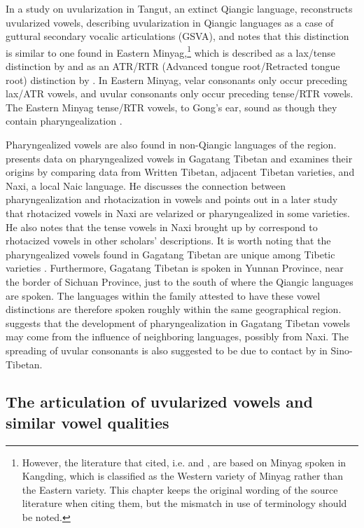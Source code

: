 \documentclass[output=paper]{langscibook}
\begin{document}
In a study on uvularization in Tangut, an extinct Qiangic language, \citet[193--194]{Gong2020} reconstructs uvularized vowels, describing uvularization in Qiangic languages as a case of guttural secondary vocalic articulations (GSVA), and notes that this distinction is similar to one found in Eastern Minyag,\footnote{However, the literature that \citet{Gong2020} cited, i.e. \cite{Huang1985} and \citet{Gao2015}, are based on Minyag spoken in Kangding, which is classified as the Western variety of Minyag rather than  the Eastern variety. This chapter keeps the original wording of the source literature when citing them, but the mismatch in use of terminology should be noted.} which is described as a lax/tense distinction by \citet{Huang1985} and as an ATR/RTR (Advanced tongue root/Retracted tongue root) distinction by \citet{Gao2015}. In Eastern Minyag, velar consonants only occur preceding lax/ATR vowels, and uvular consonants only occur preceding tense/RTR vowels. The Eastern Minyag tense/RTR vowels, to Gong’s ear, sound as though they contain pharyngealization \citep[194]{Gong2020}.

Pharyngealized vowels are also found in non-Qiangic languages of the region. \citet{Suzuki2011} presents data on pharyngealized vowels in Gagatang Tibetan and examines their origins by comparing data from Written Tibetan, adjacent Tibetan varieties, and Naxi, a local Naic language. He discusses the connection between pharyngealization and rhotacization in vowels and points out in a later study \citep[29--31]{Suzuki2013} that rhotacized vowels in Naxi are velarized or pharyngealized in some varieties. He also notes that the tense vowels in Naxi brought up by \citet{Yang1984,Yang1991} correspond to rhotacized vowels in other scholars’ descriptions. It is worth noting that the pharyngealized vowels found in Gagatang Tibetan are unique among Tibetic varieties \citep[489]{Suzuki2011}. Furthermore, Gaga\-tang Tibetan is spoken in Yunnan Province, near the border of Sichuan Province, just to the south of where the Qiangic languages are spoken. The languages within the family attested to have these vowel distinctions are therefore spoken roughly within the same geographical region. \citet[492--493]{Suzuki2011} suggests that the development of pharyngealization in Gagatang Tibetan vowels may come from the influence of neighboring languages, possibly from Naxi. The spreading of uvular consonants is also suggested to be due to contact by \citet[27]{UrbanMoran2021} in Sino-Tibetan.

\subsection{The articulation of uvularized vowels and similar vowel qualities}\label{sec:guan:3.2}
\end{document}
